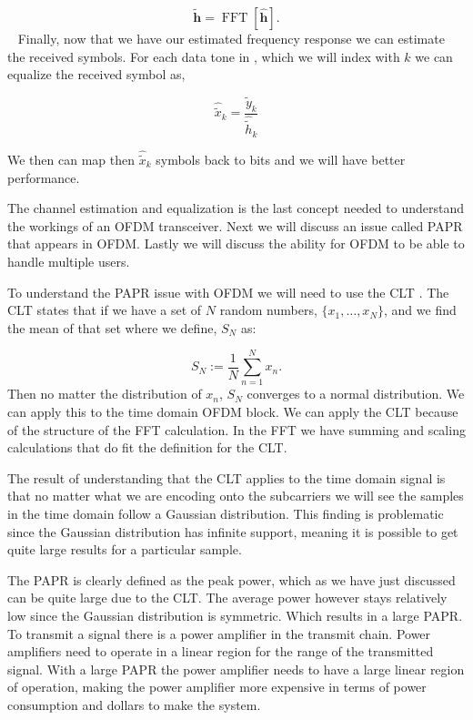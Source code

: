 \begin{equation}
\tilde{\mathbf{h}} = \operatorname{FFT}\left[\hat{\mathbf{h}}\right].
\end{equation}
 
Finally, now that we have our estimated frequency response we can estimate the received symbols. For each data tone in , which we will index with $k$ we can equalize the received symbol as,

\begin{equation}
\hat{\tilde{x}}_k= \frac{\tilde{y}_k}{\hat{\tilde{h}}_k}
\end{equation}

\noindent
We then can map then $\hat{\tilde{x}}_k$ symbols back to bits and we will have better performance.
	
The channel estimation and equalization is the last concept needed to understand the workings of an \ac{OFDM} transceiver. Next we will discuss an issue called \ac{PAPR} that appears in \ac{OFDM}. Lastly we will discuss the ability for \ac{OFDM} to be able to handle multiple users. 

To understand the \ac{PAPR} issue with \ac{OFDM} we will need to use the \ac{CLT} \cite{clt}. The \ac{CLT} states that if we have a set of $N$ random numbers, $\{x_1, \dots, x_N\}$, and we find the mean of that set where we define, $S_N$ as:

\begin{equation}
S_N := \frac{1}{N}\sum_{n=1}^{N}x_n.
\end{equation}
\noindent
Then no matter the distribution of $x_n$, $S_N$ converges to a normal distribution. We can apply this to the time domain \ac{OFDM} block. We can apply the \ac{CLT} because of the structure of the \ac{FFT} calculation. In the \ac{FFT} we have summing and scaling calculations that do fit the definition for the \ac{CLT}.

The result of understanding that the \ac{CLT} applies to the time domain signal is that no matter what we are encoding onto the subcarriers we will see the samples in the time domain follow a Gaussian distribution. This finding is problematic since the Gaussian distribution has infinite support, meaning it is possible to get quite large results for a particular sample.

The \ac{PAPR} is clearly defined as the peak power, which as we have just discussed can be quite large due to the \ac{CLT}. The average power however stays relatively low since the Gaussian distribution is symmetric. Which results in a large \ac{PAPR}. To transmit a signal there is a power amplifier in the transmit chain. Power amplifiers need to operate in a linear region for the range of the transmitted signal. With a large \ac{PAPR} the power amplifier needs to have a large linear region of operation, making the power amplifier more expensive in terms of power consumption and dollars to make the system.

